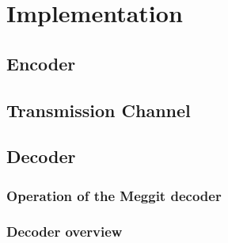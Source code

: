 \documentclass[Main]{subfiles}
\begin{document}
\chapter{Implementation}

\section{Encoder}

\section{Transmission Channel}

\section{Decoder}

\subsection{Operation of the Meggit decoder}

\subsection{Decoder overview}



\end{document}
